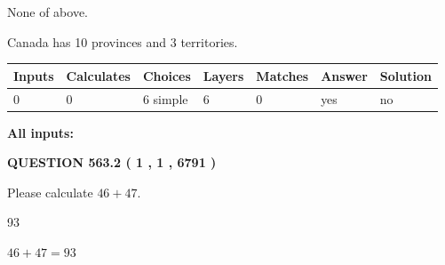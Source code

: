 \documentclass[12pt]{article}
\begin{document}
 
 None of above.
 
 
\noindent{}
 
 
Canada has 10  provinces and 3 territories.
 
 
\noindent{}
 
 
   
   
   
   
\noindent\begin{tabular}{|l|l|l|l|l|l|l|}
 \hline
Inputs & Calculates & Choices & Layers & Matches & Answer & Solution \\ \hline
 0  & 
 0  & 
 6
  simple  
  & 
 6  & 
 0  & 
  yes & 
  no 
  \\ \hline
 \end{tabular}
   
   
   
   
\noindent{}
   
   
   
   
\noindent\vspace{0.1in}\hspace{-0.08in} {\textbf{\Large{All inputs: }}}
   
   
  
\vspace{0.2in}
  
{\textbf{\Large{QUESTION
563.2 
 ( 1 , 1 , 6791 )
}}}
  
  
 
Please calculate $ %
46 +  %
47 $.
 
 
 
\noindent{}
 
 

93
 
 
\noindent{}
 
 

 
 
 
\noindent{}
 
 

$ %
46 +  %
47=   %
93$
 
\end{document}
